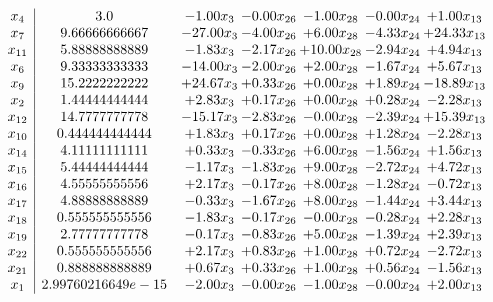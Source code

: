 \documentclass[8pt]{article}
\begin{document}
\[\begin{array}{c| c c@{\hskip 2pt} c@{\hskip 2pt} c@{\hskip 2pt} c@{\hskip 2pt} c@{\hskip 2pt} }
 x_{4}   &  3.0 & -1.00 x_{3} & -0.00 x_{26} & -1.00 x_{28} & -0.00 x_{24} & +  1.00 x_{13}\\
 x_{7}   &  9.66666666667 & -27.00 x_{3} & -4.00 x_{26} & +  6.00 x_{28} & -4.33 x_{24} & + 24.33 x_{13}\\
 x_{11}   &  5.88888888889 & -1.83 x_{3} & -2.17 x_{26} & + 10.00 x_{28} & -2.94 x_{24} & +  4.94 x_{13}\\
 x_{6}   &  9.33333333333 & -14.00 x_{3} & -2.00 x_{26} & +  2.00 x_{28} & -1.67 x_{24} & +  5.67 x_{13}\\
 x_{9}   &  15.2222222222 & + 24.67 x_{3} & +  0.33 x_{26} & +  0.00 x_{28} & +  1.89 x_{24} & -18.89 x_{13}\\
 x_{2}   &  1.44444444444 & +  2.83 x_{3} & +  0.17 x_{26} & +  0.00 x_{28} & +  0.28 x_{24} & -2.28 x_{13}\\
 x_{12}   &  14.7777777778 & -15.17 x_{3} & -2.83 x_{26} & -0.00 x_{28} & -2.39 x_{24} & + 15.39 x_{13}\\
 x_{10}   &  0.444444444444 & +  1.83 x_{3} & +  0.17 x_{26} & +  0.00 x_{28} & +  1.28 x_{24} & -2.28 x_{13}\\
 x_{14}   &  4.11111111111 & +  0.33 x_{3} & -0.33 x_{26} & +  6.00 x_{28} & -1.56 x_{24} & +  1.56 x_{13}\\
 x_{15}   &  5.44444444444 & -1.17 x_{3} & -1.83 x_{26} & +  9.00 x_{28} & -2.72 x_{24} & +  4.72 x_{13}\\
 x_{16}   &  4.55555555556 & +  2.17 x_{3} & -0.17 x_{26} & +  8.00 x_{28} & -1.28 x_{24} & -0.72 x_{13}\\
 x_{17}   &  4.88888888889 & -0.33 x_{3} & -1.67 x_{26} & +  8.00 x_{28} & -1.44 x_{24} & +  3.44 x_{13}\\
 x_{18}   &  0.555555555556 & -1.83 x_{3} & -0.17 x_{26} & -0.00 x_{28} & -0.28 x_{24} & +  2.28 x_{13}\\
 x_{19}   &  2.77777777778 & -0.17 x_{3} & -0.83 x_{26} & +  5.00 x_{28} & -1.39 x_{24} & +  2.39 x_{13}\\
 x_{22}   &  0.555555555556 & +  2.17 x_{3} & +  0.83 x_{26} & +  1.00 x_{28} & +  0.72 x_{24} & -2.72 x_{13}\\
 x_{21}   &  0.888888888889 & +  0.67 x_{3} & +  0.33 x_{26} & +  1.00 x_{28} & +  0.56 x_{24} & -1.56 x_{13}\\
 x_{1}   &  2.99760216649e-15 & -2.00 x_{3} & -0.00 x_{26} & -1.00 x_{28} & -0.00 x_{24} & +  2.00 x_{13}\\

\end{array}\]
\end{document}
